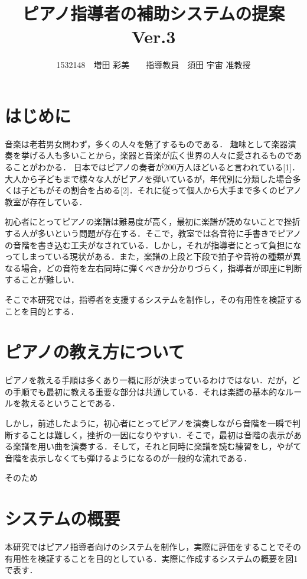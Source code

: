 \documentclass[twocolumn,10pt,a4j]{jsarticle}
\title{ピアノ指導者の補助システムの提案 Ver.3}
\author{1532148　増田 彩美　　指導教員　須田 宇宙 准教授}
\date{}
\begin{document}
\maketitle

\section{はじめに}

音楽は老若男女問わず，多くの人々を魅了するものである．
趣味として楽器演奏を挙げる人も多いことから，楽器と音楽が広く世界の人々に愛されるものであることがわかる．
日本ではピアノの奏者が200万人ほどいると言われている[1]．大人から子どもまで様々な人がピアノを弾いているが，年代別に分類した場合多くは子どもがその割合を占める[2]．それに従って個人から大手まで多くのピアノ教室が存在している．

初心者にとってピアノの楽譜は難易度が高く，最初に楽譜が読めないことで挫折する人が多いという問題が存在する．そこで，教室では各音符に手書きでピアノの音階を書き込む工夫がなされている．しかし，それが指導者にとって負担になってしまっている現状がある．また，楽譜の上段と下段で拍子や音符の種類が異なる場合，どの音符を左右同時に弾くべきか分かりづらく，指導者が即座に判断することが難しい．

そこで本研究では，指導者を支援するシステムを制作し，その有用性を検証することを目的とする．


\section{ピアノの教え方について}
ピアノを教える手順は多くあり一概に形が決まっているわけではない．だが，どの手順でも最初に教える重要な部分は共通している．それは楽譜の基本的なルールを教えるということである．

しかし，前述したように，初心者にとってピアノを演奏しながら音階を一瞬で判断することは難しく，挫折の一因になりやすい．そこで，最初は音階の表示がある楽譜を用い曲を演奏する．そして，それと同時に楽譜を読む練習をし，やがて音階を表示しなくても弾けるようになるのが一般的な流れである．

そのため

\section{システムの概要}
本研究ではピアノ指導者向けのシステムを制作し，実際に評価をすることでその有用性を検証することを目的としている．実際に作成するシステムの概要を図1で表す．
\end{document}
